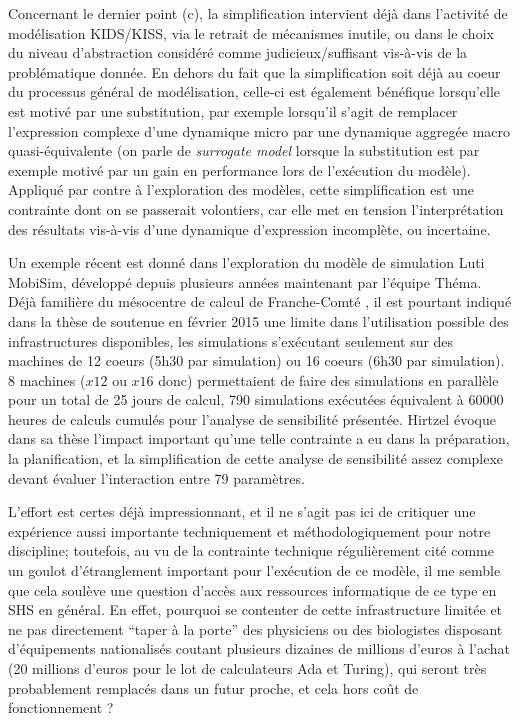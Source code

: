Concernant le dernier point (c), la simplification intervient déjà dans l'activité de modélisation KIDS/KISS, via le retrait de mécanismes inutile, ou dans le choix du niveau d'abstraction considéré comme judicieux/suffisant vis-à-vis de la problématique donnée. En dehors du fait que la simplification soit déjà au coeur du processus général de modélisation, celle-ci est également bénéfique lorsqu'elle est motivé par une substitution, par exemple lorsqu'il s'agit de remplacer l'expression complexe d'une dynamique micro par une dynamique aggregée macro quasi-équivalente (on parle de \textit{surrogate model} lorsque la substitution est par exemple motivé par un gain en performance lors de l'exécution du modèle). Appliqué par contre à l'exploration des modèles, cette simplification est une contrainte dont on se passerait volontiers, car elle met en tension l'interprétation des résultats vis-à-vis d'une dynamique d'expression incomplète, ou incertaine.

Un exemple récent est donné dans l'exploration du modèle de simulation Luti MobiSim, développé depuis plusieurs années maintenant par l'équipe Théma. Déjà familière du mésocentre de calcul de Franche-Comté \autocite{Asch2012}, il est pourtant indiqué dans la thèse de \textcite{Hirtzel2015} soutenue en février 2015 une limite dans l'utilisation possible des infrastructures disponibles, les simulations s'exécutant seulement sur des machines de 12 coeurs (5h30 par simulation) ou 16 coeurs (6h30 par simulation). 8 machines ($ x 12$ ou $ x 16$ donc) permettaient de faire des simulations en parallèle pour un total de 25 jours de calcul, 790 simulations exécutées équivalent à 60000 heures de calculs cumulés pour l'analyse de sensibilité présentée. Hirtzel évoque dans sa thèse l'impact important qu'une telle contrainte a eu dans la préparation, la planification, et la simplification de cette analyse de sensibilité assez complexe devant évaluer l'interaction entre 79 paramètres. 

L'effort est certes déjà impressionnant, et il ne s'agit pas ici de critiquer une expérience aussi importante techniquement et méthodologiquement pour notre discipline; toutefois, au vu de la contrainte technique régulièrement cité comme un goulot d'étranglement important pour l'exécution de ce modèle, il me semble que cela soulève une question d'accès aux ressources informatique de ce type en SHS en général. En effet, pourquoi se contenter de cette infrastructure limitée et ne pas directement \enquote{taper à la porte} des physiciens ou des biologistes disposant d'équipements nationalisés coutant plusieurs dizaines de millions d'euros à l'achat (20 millions d'euros pour le lot de calculateurs Ada et Turing), qui seront très probablement remplacés dans un futur proche, et cela hors coût de fonctionnement ? 

